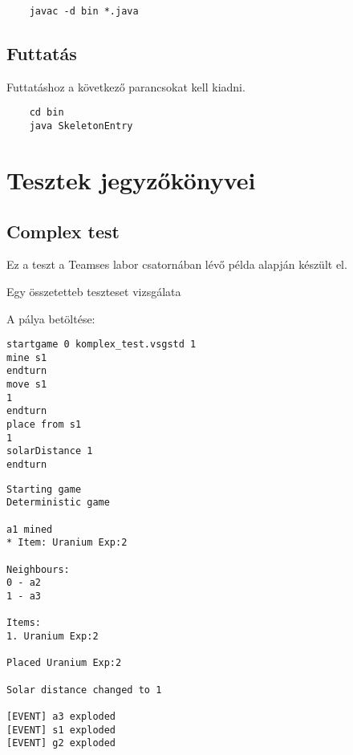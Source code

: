 \documentclass[../../projlab]{subfiles}
\begin{document}
\begin{verbatim}
    javac -d bin *.java
\end{verbatim}

\subsection{Futtatás}

Futtatáshoz a következő parancsokat kell kiadni.
\begin{verbatim}
    cd bin
    java SkeletonEntry
\end{verbatim}

\section{Tesztek jegyzőkönyvei}

\subsection{Complex test}
\begin{test-case-description}
    Ez a teszt a Teamses labor csatornában lévő példa alapján készült el.
\end{test-case-description}
\begin{test-case-function}
    Egy összetetteb teszteset vizsgálata
\end{test-case-function}
\begin{test-case-input}
A pálya betöltése:
    \begin{verbatim}
startgame 0 komplex_test.vsgstd 1
mine s1
endturn
move s1
1
endturn
place from s1
1
solarDistance 1
endturn
    \end{verbatim}


\end{test-case-input}
\begin{test-case-output}
\begin{verbatim}
Starting game
Deterministic game

a1 mined 
* Item: Uranium Exp:2

Neighbours:
0 - a2
1 - a3

Items:
1. Uranium Exp:2

Placed Uranium Exp:2

Solar distance changed to 1

[EVENT] a3 exploded
[EVENT] s1 exploded
[EVENT] g2 exploded
\end{verbatim}
\end{test-case-output}
\end{document}
